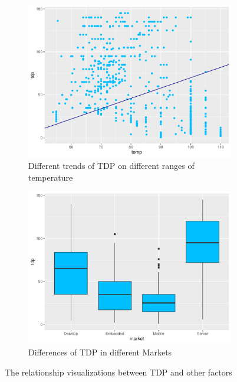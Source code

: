 \begin{figure}[H]
\begin{subfigure}[b]{0.45\textwidth}
        \includegraphics[width=\textwidth]{./graphics/scatter_tdp_temp.pdf}
        \caption{Different trends of TDP on different ranges of temperature}
        \label{fig:tdp_analysis_temp}
    \end{subfigure}
    \hfill
    \begin{subfigure}[b]{0.45\textwidth}
       \centering
       \includegraphics[width=\textwidth]{./graphics/box_tdp_market.pdf}
       \caption{Differences of TDP in different Markets}
       \label{fig:tdp_analysis_market}
    \end{subfigure}

    \caption{The relationship visualizations between TDP and other factors}
    \label{fig:tdp_analysis}
\end{figure}

